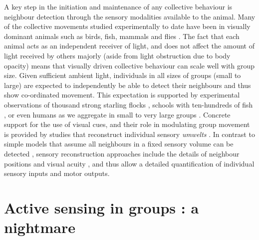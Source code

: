 \documentclass[
]{book}
\begin{document}
A key step in the initiation and maintenance of any collective behaviour is neighbour detection through the sensory modalities available to the animal. Many of the collective movements studied experimentally to date have been in visually dominant animals such as birds, fish, mammals and flies \citep{pita2016collective}. The fact that each animal acts as an independent receiver of light, and does not affect the amount of light received by others majorly (aside from light obstruction due to body opacity) means that visually driven collective behaviour can scale well with group size. Given sufficient ambient light, individuals in all sizes of groups (small to large) are expected to independently be able to detect their neighbours and thus show co-ordinated movement. This expectation is supported by experimental observations of thousand strong starling flocks \citep{ballerini2008a}, schools with ten-hundreds of fish \citep{tunstrom2013collective}, or even humans as we aggregate in small to very large groups \citep{moussaid2011simple, dyer2009leadership}. Concrete support for the use of visual cues, and their role in modulating group movement is provided by studies that reconstruct individual sensory \emph{umwelts} \citep{turner2002encoding, strandburg2013visual, belden2019vision}. In contrast to simple models that assume all neighbours in a fixed sensory volume can be detected \citep{reynolds1987a, couzin2002a}, sensory reconstruction approaches include the details of neighbour positions and visual acuity \citep{strandburg2013visual, belden2019vision}, and thus allow a detailed quantification of individual sensory inputs and motor outputs.

\hypertarget{active-sensing-in-groups-a-nightmare}{%
\section{Active sensing in groups : a nightmare}\label{active-sensing-in-groups-a-nightmare}}
\end{document}
